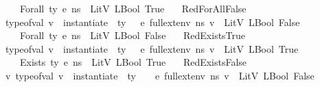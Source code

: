 \begin{isabellebody}
\ \ \ \ \ {\isasymLambda}{\isacharcomma}{\kern0pt}{\isasymGamma}{\isacharcomma}{\kern0pt}{\isasymOmega}\ {\isasymturnstile}\ {\isasymlangle}Forall\ ty\ e{\isacharcomma}{\kern0pt}\ n{\isacharunderscore}{\kern0pt}s{\isasymrangle}\ {\isasymDown}\ LitV\ {\isacharparenleft}{\kern0pt}LBool\ True{\isacharparenright}{\kern0pt}{\isachardoublequoteclose}\isanewline
\ \ {\isacharbar}{\kern0pt}\ RedForAllFalse{\isacharcolon}{\kern0pt}\isanewline
\ \ \ \ {\isachardoublequoteopen}{\isasymlbrakk}type{\isacharunderscore}{\kern0pt}of{\isacharunderscore}{\kern0pt}val\ v\ {\isacharequal}{\kern0pt}\ instantiate\ {\isasymOmega}\ ty{\isacharsemicolon}{\kern0pt}\ {\isasymLambda}{\isacharcomma}{\kern0pt}{\isasymGamma}{\isacharcomma}{\kern0pt}{\isasymOmega}\ {\isasymturnstile}\ {\isasymlangle}e{\isacharcomma}{\kern0pt}\ full{\isacharunderscore}{\kern0pt}ext{\isacharunderscore}{\kern0pt}env\ n{\isacharunderscore}{\kern0pt}s\ v{\isasymrangle}\ {\isasymDown}\ LitV\ {\isacharparenleft}{\kern0pt}LBool\ False{\isacharparenright}{\kern0pt}\ {\isasymrbrakk}\ {\isasymLongrightarrow}\ \isanewline
\ \ \ \ \ {\isasymLambda}{\isacharcomma}{\kern0pt}{\isasymGamma}{\isacharcomma}{\kern0pt}{\isasymOmega}\ {\isasymturnstile}\ {\isasymlangle}Forall\ ty\ e{\isacharcomma}{\kern0pt}\ n{\isacharunderscore}{\kern0pt}s{\isasymrangle}\ {\isasymDown}\ LitV\ {\isacharparenleft}{\kern0pt}LBool\ False{\isacharparenright}{\kern0pt}{\isachardoublequoteclose}\isanewline
\ \ {\isacharbar}{\kern0pt}\ RedExistsTrue{\isacharcolon}{\kern0pt}\isanewline
\ \ \ \ {\isachardoublequoteopen}{\isasymlbrakk}type{\isacharunderscore}{\kern0pt}of{\isacharunderscore}{\kern0pt}val\ v\ {\isacharequal}{\kern0pt}\ instantiate\ {\isasymOmega}\ ty{\isacharsemicolon}{\kern0pt}\ {\isasymLambda}{\isacharcomma}{\kern0pt}{\isasymGamma}{\isacharcomma}{\kern0pt}{\isasymOmega}\ {\isasymturnstile}\ {\isasymlangle}e{\isacharcomma}{\kern0pt}\ full{\isacharunderscore}{\kern0pt}ext{\isacharunderscore}{\kern0pt}env\ n{\isacharunderscore}{\kern0pt}s\ v{\isasymrangle}\ {\isasymDown}\ LitV\ {\isacharparenleft}{\kern0pt}LBool\ True{\isacharparenright}{\kern0pt}\ {\isasymrbrakk}\ {\isasymLongrightarrow}\isanewline
\ \ \ \ \ {\isasymLambda}{\isacharcomma}{\kern0pt}{\isasymGamma}{\isacharcomma}{\kern0pt}{\isasymOmega}\ {\isasymturnstile}\ {\isasymlangle}Exists\ ty\ e{\isacharcomma}{\kern0pt}\ n{\isacharunderscore}{\kern0pt}s{\isasymrangle}\ {\isasymDown}\ LitV\ {\isacharparenleft}{\kern0pt}LBool\ True{\isacharparenright}{\kern0pt}{\isachardoublequoteclose}\isanewline
\ \ {\isacharbar}{\kern0pt}\ RedExistsFalse{\isacharcolon}{\kern0pt}\isanewline
\ \ \ \ {\isachardoublequoteopen}{\isasymlbrakk}{\isasymAnd}v{\isachardot}{\kern0pt}\ type{\isacharunderscore}{\kern0pt}of{\isacharunderscore}{\kern0pt}val\ v\ {\isacharequal}{\kern0pt}\ instantiate\ {\isasymOmega}\ ty\ {\isasymLongrightarrow}\ {\isasymLambda}{\isacharcomma}{\kern0pt}{\isasymGamma}{\isacharcomma}{\kern0pt}{\isasymOmega}\ {\isasymturnstile}\ {\isasymlangle}e{\isacharcomma}{\kern0pt}\ full{\isacharunderscore}{\kern0pt}ext{\isacharunderscore}{\kern0pt}env\ n{\isacharunderscore}{\kern0pt}s\ v{\isasymrangle}\ {\isasymDown}\ LitV\ {\isacharparenleft}{\kern0pt}LBool\ False{\isacharparenright}{\kern0pt}\ {\isasymrbrakk}\ {\isasymLongrightarrow}\isanewline

\end{isabellebody}
